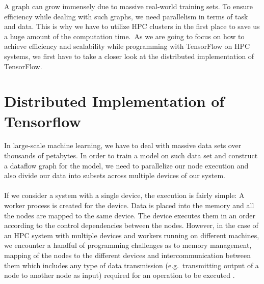 \documentclass[ieeetran]{article}
\begin{document}
\addtocounter{footnote}{-2}

\hspace{-0.51cm}A graph can grow immensely due to massive real-world training sets. To ensure efficiency while dealing with such graphs, we need parallelism in terms of task and data. This is why we have to utilize HPC clusters in the first place to save us a huge amount of the computation time.\ As we are going to focus on how to achieve efficiency and scalability while programming with TensorFlow on HPC systems, we first have to take a closer look at the distributed implementation of TensorFlow.


\section{Distributed Implementation of Tensorflow} %
\label{sec:multiple_device_execution_of_a_graph}
In large-scale machine learning, we have to deal with massive data sets over thousands of petabytes. In order to train a model on such data set and construct a dataflow graph for the model, we need to parallelize our node execution and also divide our data into subsets across multiple devices of our system.
\\ \\If we consider a system with a single device, the execution is fairly simple: A worker process is created for the device. Data is placed into the memory and all the nodes are mapped to the same device. The device executes them in an order according to the control dependencies between the nodes. However, in the case of an HPC system with multiple devices and workers running on different machines, we encounter a handful of programming challenges as to memory management, mapping of the nodes to the different devices and intercommunication between them which includes any type of data transmission (e.g.\ transmitting output of a node to another node as input) required for an operation to be executed \cite{first}.
\end{document}
